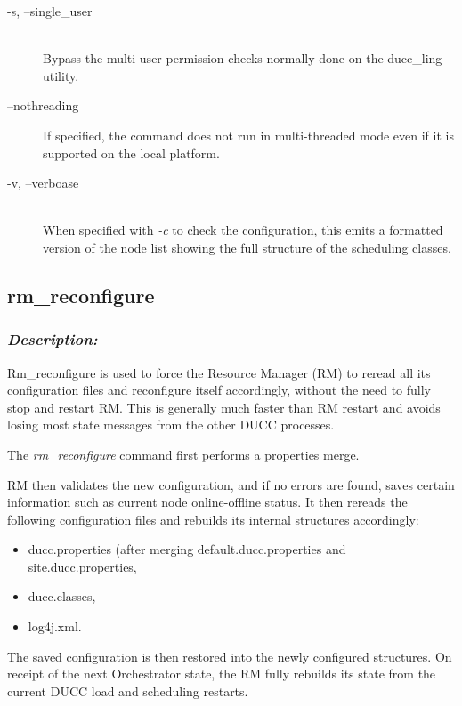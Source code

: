 \begin{description}
            \item[-s, --single\_user] \hfill \\
              Bypass the multi-user permission checks normally done on the ducc\_ling utility.
              
            \item[--nothreading] If specified, the command does not run in multi-threaded mode
              even if it is supported on the local platform.

            \item[-v, --verboase] \hfill \\
              When specified with {\em -c} to check the configuration, this emits a formatted version
              of the node list showing the full structure of the scheduling classes.
              

           \end{description}               

\subsection{rm\_reconfigure}
\label{subsec:admin.rm-reconfigure}

    \subsubsection{{\em Description:}}
    Rm\_reconfigure is used to force the Resource Manager (RM) to reread all its configuration
    files and reconfigure itself accordingly, without the need to fully stop and restart RM.
    This is generally much faster than RM restart and avoids losing most state messages from
    the other DUCC processes.
    
    The {\em rm\_reconfigure} command first performs a 
    \hyperref[sec:admin.properties-merge]{properties merge.}

    RM then validates the new
    configuration, and if no errors are found, saves certain information such as current node
    online-offline status.  It then rereads the following configuration files and rebuilds its
    internal structures accordingly:
    \begin{itemize}
      \item ducc.properties (after merging default.ducc.properties and site.ducc.properties,
      \item ducc.classes,
      \item log4j.xml.
    \end{itemize}
    The saved configuration is then restored into the newly configured structures.
    On receipt of the next Orchestrator state, the RM fully rebuilds its state from the current
    DUCC load and scheduling restarts.

